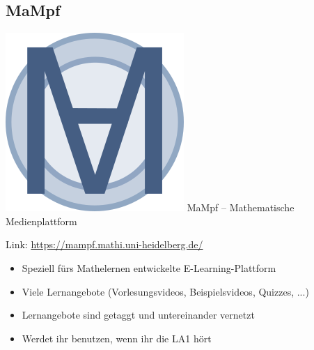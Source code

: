 \subsection{MaMpf}
\begin{frame}{\includegraphics[scale=0.072]{images/mampf.png} MaMpf -- Mathematische Medienplattform}

    Link: \url{https://mampf.mathi.uni-heidelberg.de/}

    \begin{center}
    \end{center}

    \begin{itemize}
        \item Speziell fürs Mathelernen entwickelte E-Learning-Plattform
        \item Viele Lernangebote (Vorlesungsvideos, Beispielsvideos, Quizzes, ...)
        \item Lernangebote sind getaggt und untereinander vernetzt
        \item Werdet ihr benutzen, wenn ihr die LA1 hört
    \end{itemize}

\end{frame}

